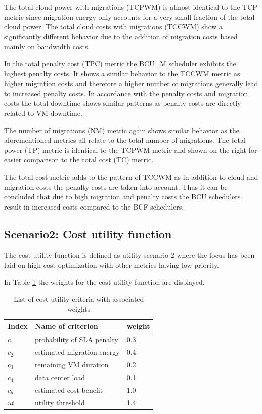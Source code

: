 The total cloud power with migrations (TCPWM) is almost identical to the TCP metric since migration energy only accounts for a very small fraction of the total cloud power. The total cloud costs with migrations (TCCWM) show a significantly different behavior due to the addition of migration costs based mainly on bandwidth costs. 

In the total penalty cost (TPC) metric the BCU\_M scheduler exhibits the highest penalty costs. It shows a similar behavior to the TCCWM metric as higher migration costs and therefore a higher number of migrations generally lead to increased penalty costs. 
In accordance with the penalty costs and migration costs the total downtime shows similar patterns as penalty costs are directly related to VM downtime. 

The number of migrations (NM) metric again shows similar behavior as the aforementioned metrics all relate to the total number of migrations. The total power (TP) metric is identical to the TCPWM metric and shown on the right for easier comparison to the total cost (TC) metric. 

The total cost metric adds to the pattern of TCCWM as in addition to cloud and migration costs the penalty costs are taken into account. 
Thus it can be concluded that due to high migration and penalty costs the BCU schedulers result in increased costs compared to the BCF schedulers. 


\subsection{Scenario2: Cost utility function}

The cost utility function is defined as utility scenario 2 where the focus has been laid on high cost optimization with other metrics having low priority. 

In Table \ref{tab:list_of_cost_utility_criteria_weights} the weights for the cost utility function are displayed. 

\begin{table}[htbp]
\centering
\begin{tabular}{lll}
\toprule
	Index & Name of criterion	& weight \\
\midrule
	$c_1$ & probability of SLA penalty & 0.3 \\
	$c_2$ & estimated migration energy & 0.4 \\
	$c_3$ & remaining VM duration & 0.2 \\
	$c_4$ & data center load & 0.1 \\
	$c_5$ & estimated cost benefit & 1.0 \\
	$ut$ & utility threshold & 1.4 \\
\bottomrule
\end{tabular}
\caption{List of cost utility criteria with associated weights}
\label{tab:list_of_cost_utility_criteria_weights}
\end{table}

